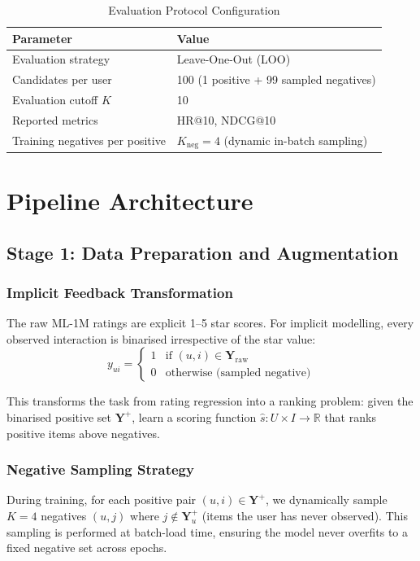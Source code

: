\documentclass[11pt,a4paper]{article}
\begin{document}
\begin{table}[H]
  \centering
  \caption{Evaluation Protocol Configuration}
  \label{tab:eval_protocol}
  \begin{tabular}{ll}
    \toprule
    \textbf{Parameter} & \textbf{Value} \\
    \midrule
    Evaluation strategy          & Leave-One-Out (LOO) \\
    Candidates per user          & 100 (1 positive + 99 sampled negatives) \\
    Evaluation cutoff $K$        & 10 \\
    Reported metrics             & HR@10, NDCG@10 \\
    Training negatives per positive & $K_\text{neg}=4$ (dynamic in-batch sampling) \\
    \bottomrule
  \end{tabular}
\end{table}

\section{Pipeline Architecture}

\subsection{Stage 1: Data Preparation and Augmentation}

\subsubsection{Implicit Feedback Transformation}
The raw ML-1M ratings are explicit 1–5 star scores. For implicit modelling, every observed interaction is binarised irrespective of the star value:
\begin{equation}
  y_{ui} = \begin{cases} 1 & \text{if } (u,i) \in \mathbf{Y}_{\text{raw}} \\ 0 & \text{otherwise (sampled negative)} \end{cases}
\end{equation}

This transforms the task from rating regression into a ranking problem: given the binarised positive set $\mathbf{Y}^{+}$, learn a scoring function $\hat{s}\colon U \times I \to \mathbb{R}$ that ranks positive items above negatives.

\subsubsection{Negative Sampling Strategy}
During training, for each positive pair $(u,i) \in \mathbf{Y}^{+}$, we dynamically sample $K=4$ negatives $(u,j)$ where $j \notin \mathbf{Y}^{+}_u$ (items the user has never observed). This sampling is performed at batch-load time, ensuring the model never overfits to a fixed negative set across epochs.
\end{document}
